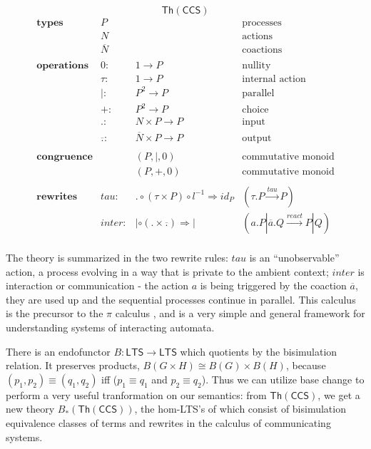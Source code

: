 \documentclass{amsart}
\theoremstyle{definition}
\newcommand{\Th}{\mathsf{Th}}
\newcommand{\maps}{\colon}
\begin{document}
\[\Th(\mathsf{CCS})\]
\[\begin{array}{lrll}
    \textbf{types} & P && \text{processes}\\
                   & N && \text{actions}\\
                   & \overline{N} && \text{coactions}\\\\
    \textbf{operations} & 0\maps & 1\to P & \text{nullity}\\
                   & \tau\maps & 1\to P & \text{internal action}\\
                   & |\maps & P^2\to P & \text{parallel}\\
                   & +\maps & P^2\to P &\text{choice}\\
                   & .\maps & N\times P\to P & \text{input}\\
                   & \overline{.}\maps & \overline{N}\times P\to P & \text{output}\\\\
    \textbf{congruence} && (P,|,0) & \text{commutative monoid}\\
                   && (P,+,0) & \text{commutative monoid}\\\\
    \textbf{rewrites} & tau\maps & .\circ (\tau\times P)\circ l^{-1} \Rightarrow id_P & (\tau.P \xrightarrow{tau} P)\\
                   & inter \maps & |\circ (.\times \overline{.}) \Rightarrow | & (a.P|\overline{a}.Q \xrightarrow{react} P|Q)\\
  \end{array}\]

The theory is summarized in the two rewrite rules: $tau$ is an ``unobservable'' action, a process evolving in a way that is private to the ambient context; $inter$ is interaction or communication - the action $a$ is being triggered by the coaction $\overline{a}$, they are used up and the sequential processes continue in parallel. This calculus is the precursor to the $\pi$ calculus \cite{milner}, and is a very simple and general framework for understanding systems of interacting automata.

There is an endofunctor $B\maps \mathsf{LTS} \to \mathsf{LTS}$ which quotients by the bisimulation relation. It preserves products, $B(G\times H)\cong B(G)\times B(H)$, because $(p_1,p_2)\equiv(q_1,q_2)$ iff ($p_1\equiv q_1$ and $p_2\equiv q_2$). Thus we can utilize base change to perform a very useful tranformation  on our semantics: from $\Th(\mathsf{CCS})$, we get a new theory $B_*(\Th(\mathsf{CCS}))$, the hom-LTS's of which consist of bisimulation equivalence classes of terms and rewrites in the calculus of communicating systems.
\end{document}
